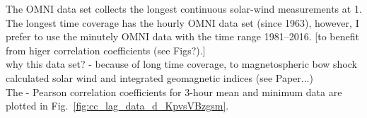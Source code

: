 The OMNI data set collects the longest continuous solar-wind measurements at \SI{1}{\au}. The longest time coverage has the hourly OMNI data set (since 1963), however, I prefer to use the minutely OMNI data with the time range 1981--2016. [to benefit from higer correlation coefficients (see Figs?).]\\

why this data set? - because of long time coverage, to magnetospheric bow shock calculated solar wind and integrated geomagnetic indices (see Paper...)\\

The \Kp{}-\vBz{} Pearson correlation coefficients for 3-hour mean and minimum data are plotted in Fig.~\ref{fig:cc_lag_data_d_KpvsVBzgsm}.
\begin{figure}[htb]
	\begin{floatrow}
\end{floatrow}
\end{figure}
